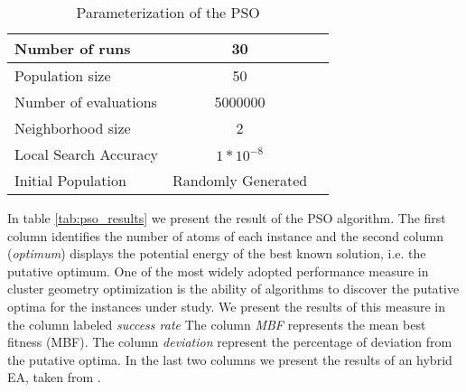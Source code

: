 	\begin{table}[htdp]
		\label{tab:pso_parameters}
		\begin{center}
			\begin{tabular}{| l | c | r | }
				\hline
				Number of runs & 30 \\ \hline
				Population size & 50 \\ \hline
				Number of evaluations & 5000000 \\ \hline
				Neighborhood size & 2 \\ \hline
				Local Search Accuracy & $1*10^{-8}$ \\ \hline
				Initial Population & Randomly Generated \\ \hline
		
			\end{tabular}
		\end{center}
		\caption{Parameterization of the PSO} 
	\end{table}
	
	In table \ref{tab:pso_results} we present the result of the PSO algorithm. The first column identifies the number of atoms of each instance and the second column (\emph{optimum}) displays the potential energy of the best known solution, i.e. the putative optimum. One of the most widely adopted performance measure in cluster geometry optimization is the ability of algorithms to discover the putative optima for the instances under study. We present the results of this measure in the column labeled \emph{success rate} The column \emph{MBF} represents the mean best fitness (MBF). The column \emph{deviation} represent the percentage of deviation from the putative optima. In the last two columns we present the results of an hybrid EA, taken from \cite{xico09}.
	
